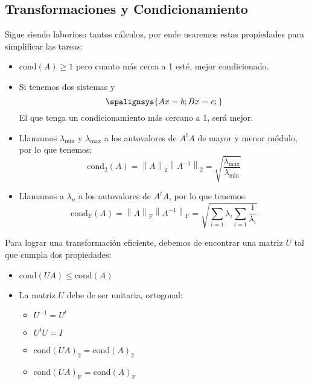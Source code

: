 \subsection{Transformaciones y Condicionamiento}
Sigue siendo laborioso tantos cálculos, por ende usaremos estas propiedades para simplificar las tareas:
\begin{itemize}
        \item \(\text{cond}(A) \geq 1\) pero cuanto más cerca a 1 esté, mejor condicionado.
        \item Si tenemos dos sistemas y \[
                      \spalignsys{
                              Ax = b ;
                              Bx = c;
                      }
              \] El que tenga un condicionamiento más cercano a 1, será mejor.
        \item Llamamos \(\lambda_{\text{min}}\) y \(\lambda_{\text{max}}\) a los autovalores de \(A^tA\) de mayor y menor módulo, por lo que tenemos:
              \[
                      \boxed{\text{cond}_2(A) = \left \| A \right \|_2 \left \| A^{-1} \right \|_2=\sqrt{\frac{\lambda_{\text{max}}}{\lambda_{\text{min}}}}}
              \]
        \item Llamamos a \(\lambda_n\) a los autovalores de \(A^tA\), por lo que tenemos:
              \[
                      \boxed{\text{cond}_\text{F}(A) = \left \| A \right \|_\text{F} \left \| A^{-1} \right \|_\text{F}=\sqrt{\sum_{i=1}\lambda_i \sum_{i=1}\frac{1}{\lambda_i}}}
              \]
\end{itemize}
Para lograr una transformación eficiente, debemos de encontrar una matriz \(U\) tal que cumpla dos propiedades:
\begin{itemize}
        \item \(\text{cond}(UA)\leq \text{cond}(A)\)
        \item La matriz \(U\) debe de ser unitaria, ortogonal:
              \begin{itemize}
                      \item \(U^{-1} = U^t\)
                      \item \(U^tU = I\)
                      \item \(\text{cond}(UA)_2 = \text{cond}(A)_2\)
                      \item \(\text{cond}(UA)_\text{F} = \text{cond}(A)_\text{F}\)
              \end{itemize}
\end{itemize}
